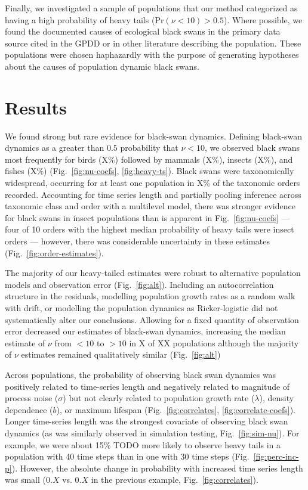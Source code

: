 Finally, we investigated a sample of populations that our method categorized as
having a high probability of heavy tails (Pr$(\nu < 10) > 0.5$). Where
possible, we found the documented causes of ecological black swans in the
primary data source cited in the GPDD or in other literature describing the
population. These populations were chosen haphazardly with the purpose of
generating hypotheses about the causes of population dynamic black swans.

\section{Results}

We found strong but rare evidence for black-swan dynamics. Defining black-swan
dynamics as a greater than $0.5$ probability that $\nu < 10$, we observed black
swans most frequently for birds (X\%) followed by mammals (X\%), insects (X\%),
and fishes (X\%) (Fig.~\ref{fig:nu-coefs}, \ref{fig:heavy-ts}). Black swans
were taxonomically widespread, occurring for at least one population in X\% of
the taxonomic orders recorded. Accounting for time series length and partially
pooling inference across taxonomic class and order with a multilevel model,
there was stronger evidence for black swans in insect populations than is
apparent in Fig.~\ref{fig:nu-coefs} --- four of 10 orders with the highest
median probability of heavy tails were insect orders --- however, there was
considerable uncertainty in these estimates (Fig.~\ref{fig:order-estimates}).

The majority of our heavy-tailed estimates were robust to alternative
population models and observation error (Fig.~\ref{fig:alt}). Including an
autocorrelation structure in the residuals, modelling population growth rates
as a random walk with drift, or modelling the population dynamics as
Ricker-logistic did not systematically alter our conclusions. Allowing for
a fixed quantity of observation error decreased our estimates of black-swan
dynamics, increasing the median estimate of $\nu$ from $<10$ to $>10$ in X of
XX populations although the majority of $\nu$ estimates remained qualitatively
similar (Fig.~\ref{fig:alt})

Across populations, the probability of observing black swan dynamics was
positively related to time-series length and negatively related to magnitude of
process noise ($\sigma$) but not clearly related to population growth rate
($\lambda$), density dependence ($b$), or maximum lifespan
(Fig.~\ref{fig:correlates}, \ref{fig:correlate-coefs}). Longer time-series
length was the strongest covariate of observing black swan dynamics (as was
similarly observed in simulation testing, Fig.~\ref{fig:sim-nu}). For example,
we were about 15\% TODO more likely to observe heavy tails in a population with
40 time steps than in one with 30 time steps (Fig.~\ref{fig:perc-inc-p}).
However, the absolute change in probability with increased time series length
was small ($0.X$ vs. $0.X$ in the previous example, Fig.~\ref{fig:correlates}).


